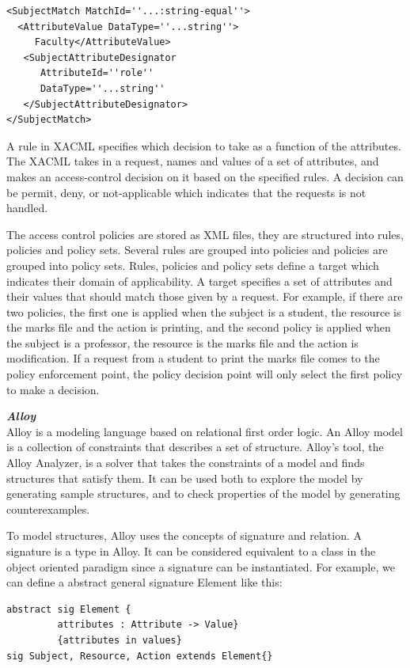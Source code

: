 \documentclass{acm_proc_article-sp}
\begin{document}
\begin{verbatim}
<SubjectMatch MatchId=''...:string-equal''>
  <AttributeValue DataType=''...string''>
     Faculty</AttributeValue>
   <SubjectAttributeDesignator 
      AttributeId=''role''
      DataType=''...string''
   </SubjectAttributeDesignator>
</SubjectMatch>
\end{verbatim}

A rule in XACML specifies which decision to take as a function of the attributes. The XACML takes in a request, names and values of a set of attributes, and makes an access-control decision on it based on the specified rules. A decision can be permit, deny, or not-applicable which indicates that the requests is not handled. 

The access control policies are stored as XML files, they are structured into rules, policies and policy sets. Several rules are grouped into policies and policies are grouped into
policy sets. Rules, policies and policy sets define a target which indicates their domain of applicability. A target specifies a set of attributes and their values that should match those
given by a request. For example, if there are two policies, the first one is applied when the subject is a student, the resource is the marks file and the action is printing, and the second policy is applied
when the subject is a professor, the resource is the marks file and the action is modification. If a request from a student to print the marks file comes to the policy enforcement point, the policy decision point will only select the first policy to make a decision.

\textbf{\emph{Alloy}}\\
Alloy \cite{jackson:alloy} is a modeling language based on relational first order logic. An Alloy model is a collection of constraints that describes a set of structure. Alloy's tool, the Alloy Analyzer, is a solver that takes the constraints of a model and finds structures that satisfy them. It can be used both to explore the model by generating sample structures, and to check properties of the model by generating counterexamples. 

To model structures, Alloy uses the concepts of signature and relation. A signature is a type in Alloy. It can be considered equivalent to a class in the object oriented paradigm since a signature can be instantiated. For example, we can define a abstract general signature Element like this:
 
 \begin{verbatim}
abstract sig Element {
         attributes : Attribute -> Value}
         {attributes in values}
sig Subject, Resource, Action extends Element{}
\end{verbatim}
\end{document}
